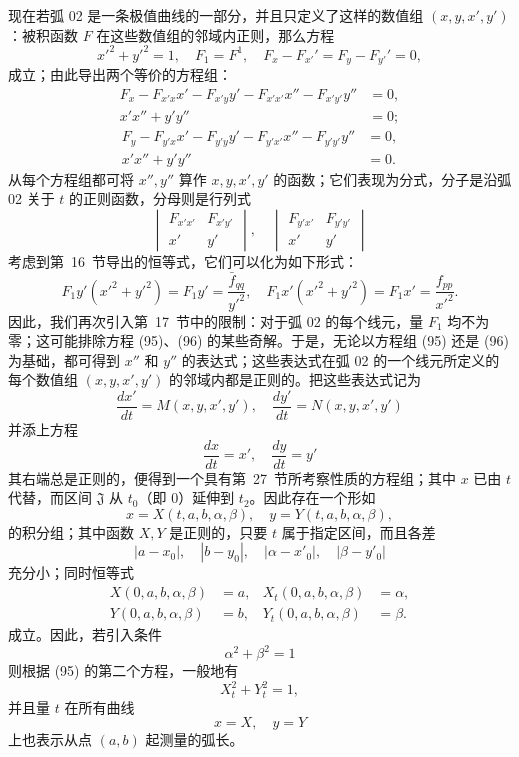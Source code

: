 \documentclass[11pt,a4paper,leqno]{article}
\begin{document}
现在若弧 02 是一条极值曲线的一部分，并且只定义了这样的数值组 $(x,y,x',y')$：被积函数 $F$ 在这些数值组的邻域内正则，那么方程
\[
x'^2+y'^2=1,
\quad
F_1=F^1,
\quad
F_x-F_{x'}'=F_y-F_{y'}'=0,
\]
成立；由此导出两个等价的方程组：
\begin{equation}\tag{95}
\begin{aligned}
F_x-F_{x'x}x'-F_{x'y}y'-F_{x'x'}x''-F_{x'y'}y''&=0,\\
x'x''+y'y''&=0;
\end{aligned}
\end{equation}
\begin{equation}\tag{96}
\begin{aligned}
F_y-F_{y'x}x'-F_{y'y}y'-F_{y'x'}x''-F_{y'y'}y''&=0,\\
x'x''+y'y''&=0.
\end{aligned}
\end{equation}
从每个方程组都可将 $x'',y''$ 算作 $x,y,x',y'$ 的函数；它们表现为分式，分子是沿弧 02 关于 $t$ 的正则函数，分母则是行列式
\[
\begin{vmatrix}
F_{x'x'}&F_{x'y'}\\
x'&y'
\end{vmatrix},
\quad
\begin{vmatrix}
F_{y'x'}&F_{y'y'}\\
x'&y'
\end{vmatrix}
\]
考虑到第~16~节导出的恒等式，它们可以化为如下形式：
\[
F_1y'(x'^2+y'^2)=F_1y'=\frac{\bar f_{qq}}{y'^2},
\quad
F_1x'(x'^2+y'^2)=F_1x'=\frac{f_{pp}}{x'^2}.
\]
因此，我们再次引入第~17~节中的限制：对于弧 02 的每个线元，量 $F_1$ 均不为零；这可能排除方程 (95)、(96) 的某些奇解。于是，无论以方程组 (95) 还是 (96) 为基础，都可得到 $x''$ 和 $y''$ 的表达式；这些表达式在弧 02 的一个线元所定义的每个数值组 $(x,y,x',y')$ 的邻域内都是正则的。把这些表达式记为
\[
\frac{dx'}{dt}=M(x,y,x',y'),
\quad
\frac{dy'}{dt}=N(x,y,x',y')
\]
并添上方程
\[
\frac{dx}{dt}=x',
\quad
\frac{dy}{dt}=y'
\]
其右端总是正则的，便得到一个具有第~27~节所考察性质的方程组；其中 $x$ 已由 $t$ 代替，而区间 $\mathfrak J$ 从 $t_0$（即 0）延伸到 $t_2$。因此存在一个形如
\begin{equation}\tag{97}
x=X(t,a,b,\alpha,\beta),
\quad
y=Y(t,a,b,\alpha,\beta),
\end{equation}
的积分组；其中函数 $X,Y$ 是正则的，只要 $t$ 属于指定区间，而且各差
\[
|a-x_0|,
\quad
|b-y_0|,
\quad
|\alpha-x'_0|,
\quad
|\beta-y'_0|
\]
充分小；同时恒等式
\begin{equation}\tag{98}
\begin{aligned}
X(0,a,b,\alpha,\beta)&=a,
&X_t(0,a,b,\alpha,\beta)&=\alpha,\\
Y(0,a,b,\alpha,\beta)&=b,
&Y_t(0,a,b,\alpha,\beta)&=\beta.
\end{aligned}
\end{equation}
成立。因此，若引入条件
\[
\alpha^2+\beta^2=1
\]
则根据 (95) 的第二个方程，一般地有
\[
X_t^2+Y_t^2=1,
\]
并且量 $t$ 在所有曲线
\[
x=X,
\quad
y=Y
\]
上也表示从点 $(a,b)$ 起测量的弧长。
\end{document}
